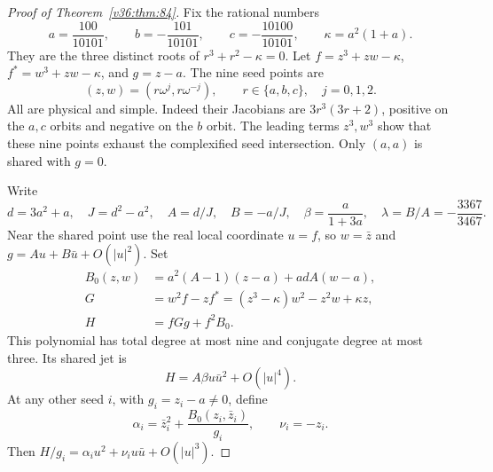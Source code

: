 \documentclass[UTF8,11pt]{ctexart}
\theoremstyle{definition}
\numberwithin{equation}{section}
\begin{document}
\begin{proof}[Proof of Theorem~\ref{v36:thm:84}]
Fix the rational numbers
\[
 a=\frac{100}{10101},\qquad b=-\frac{101}{10101},\qquad
 c=-\frac{10100}{10101},\qquad \kappa=a^2(1+a).
\]
They are the three distinct roots of $r^3+r^2-\kappa=0$.
Let $f=z^3+zw-\kappa$, $f^*=w^3+zw-\kappa$, and $g=z-a$.
The nine seed points are
\[
 (z,w)=(r\omega^j,r\omega^{-j}),\qquad
 r\in\{a,b,c\},\quad j=0,1,2.
\]
All are physical and simple. Indeed their Jacobians are
$3r^3(3r+2)$, positive on the $a,c$ orbits and negative on
the $b$ orbit. The leading terms $z^3,w^3$ show that these
nine points exhaust the complexified seed intersection.
Only $(a,a)$ is shared with $g=0$.

Write
\[
 d=3a^2+a,\quad J=d^2-a^2,\quad A=d/J,\quad B=-a/J,
 \quad \beta=\frac{a}{1+3a},\quad \lambda=B/A=-\frac{3367}{3467}.
\]
Near the shared point use the real local coordinate $u=f$,
so $w=\bar z$ and $g=Au+B\bar u+O(|u|^2)$. Set
\begin{align*}
 B_0(z,w)&=a^2(A-1)(z-a)+adA(w-a),\\
 G&=w^2f-zf^*=(z^3-\kappa)w^2-z^2w+\kappa z,\\
 H&=fGg+f^2B_0.
\end{align*}
This polynomial has total degree at most nine and conjugate
degree at most three. Its shared jet is
\begin{equation}\label{v36:eq:sharedH}
                         H=A\beta u\bar u^2+O(|u|^4).
\end{equation}
At any other seed $i$, with $g_i=z_i-a\ne0$, define
\[
 \alpha_i=\bar z_i^2+\frac{B_0(z_i,\bar z_i)}{g_i},
 \qquad \nu_i=-z_i.
\]
Then $H/g_i=\alpha_i u^2+\nu_i u\bar u+O(|u|^3)$.


\end{proof}
\end{document}

